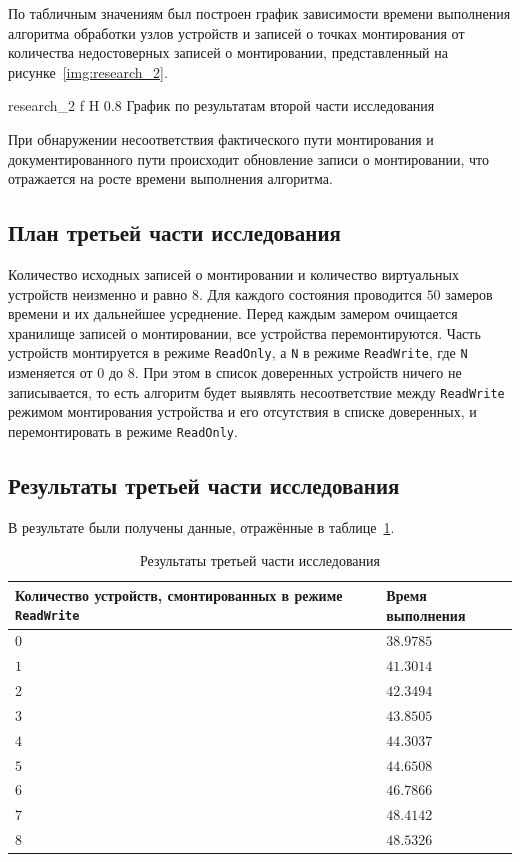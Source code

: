 По табличным значениям был построен график зависимости времени выполнения алгоритма обработки узлов устройств и 
записей о точках монтирования от количества недостоверных записей о монтировании, представленный на рисунке~\ref{img:research_2}.

    {research_2}
    {f}
    {H}
    {0.8\textwidth}
    {График по результатам второй части исследования}

При обнаружении несоответствия фактического пути монтирования и документированного пути происходит обновление записи о монтировании, 
что отражается на росте времени выполнения алгоритма. 

\subsection{План третьей части исследования}

Количество исходных записей о монтировании и количество виртуальных устройств неизменно и равно $8$.
Для каждого состояния проводится $50$ замеров времени и их дальнейшее усреднение.
Перед каждым замером очищается хранилище записей о монтировании, все устройства перемонтируются.
Часть устройств монтируется в режиме \texttt{ReadOnly}, а \texttt{N} в режиме \texttt{ReadWrite},
где \texttt{N} изменяется от $0$ до $8$. При этом в список доверенных устройств ничего не записывается, то
есть алгоритм будет выявлять несоответствие между \texttt{ReadWrite} режимом монтирования устройства и его отсутствия
в списке доверенных, и перемонтировать в режиме \texttt{ReadOnly}.

\subsection{Результаты третьей части исследования}

В результате были получены данные, отражённые в таблице~\ref{tab:res_3}.

\begin{table}[H]
    \caption{Результаты третьей части исследования}
    \begin{tabular}{|p{10cm}|p{5cm}|}
    \hline

    \textbf{Количество устройств, смонтированных в режиме \texttt{ReadWrite}}
    & \textbf{Время выполнения} \\
    \hline

    $0$ & $38.9785$ \\ \hline
    $1$ & $41.3014$ \\ \hline
    $2$ & $42.3494$ \\ \hline
    $3$ & $43.8505$ \\ \hline
    $4$ & $44.3037$ \\ \hline
    $5$ & $44.6508$ \\ \hline
    $6$ & $46.7866$ \\ \hline
    $7$ & $48.4142$ \\ \hline
    $8$ & $48.5326$ \\ \hline

    \end{tabular}
    \label{tab:res_3}
\end{table}

